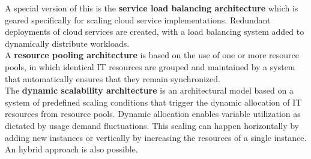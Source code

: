 A special version of this is the \textbf{service load balancing architecture} which is geared specifically for scaling cloud service implementations.
Redundant deployments of cloud services are created, with a load balancing system added to dynamically distribute workloads.\\

A \textbf{resource pooling architecture} is based on the use of one or more resource pools, in which identical IT resources are grouped and maintained by a system that automatically ensures that they remain synchronized.\\

The \textbf{dynamic scalability architecture} is an architectural model based on a system of predefined scaling conditions that trigger the dynamic allocation of IT resources from resource pools.
Dynamic allocation enables variable utilization as dictated by usage demand fluctuations.
This scaling can happen horizontally by adding new instances or vertically by increasing the resources of a single instance.
An hybrid approach is also possible.\\
